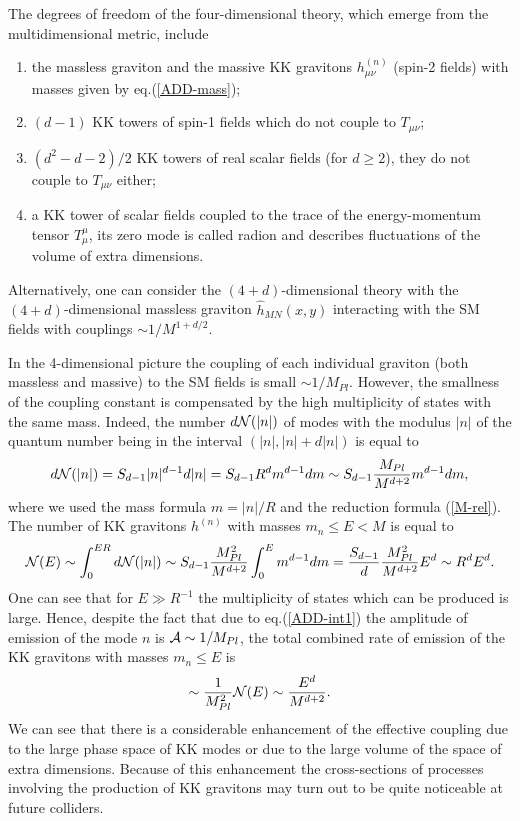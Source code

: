 \documentclass{cernyrep}
\begin{document}
The degrees of freedom of the four-dimensional theory, which
emerge from the multidimensional metric, include~\cite{GRW,Hew}
\begin{enumerate}
  \item the massless graviton and the massive KK gravitons $h^{(n)}_{\mu\nu}$
(spin-2 fields) with masses given by eq.(\ref{ADD-mass});
  \item $(d-1)$ KK towers of spin-1 fields which do not couple to $T_{\mu \nu}$;
  \item $(d^{2}-d-2)/2$ KK towers of real scalar fields (for $d \geq 2$), they
do not couple to $T_{\mu \nu}$ either;
\item  a KK tower of scalar fields coupled to the trace of the
energy-momentum tensor $T_{\mu}^{\mu}$, its zero mode is called
radion and describes fluctuations of the volume of extra
dimensions.
\end{enumerate}
Alternatively, one can consider the $(4+d)$-dimensional theory
with the $(4+d)$-dimensional massless graviton $\hat{h}_{MN}(x,y)$
interacting with the SM fields with couplings $\sim 1/M^{1+d/2}$.

In the 4-dimensional  picture the coupling of each individual
graviton (both massless and massive) to the SM fields is small
$\sim 1/M_{Pl}$. However, the smallness of the coupling constant
is compensated by the high multiplicity of states with the same
mass. Indeed, the number $d{\cal N}(|n|)$ of modes with the
modulus $|n|$ of the quantum number being in the interval
$(|n|,|n|+d|n|)$ is equal to
\begin{equation}\label{ADD-dN}
  d{\cal N}(|n|) = S_{d-1} |n|^{d-1}d|n| = S_{d-1} R^{d}
m^{d-1}dm \sim S_{d-1} \frac{M_{Pl}}{M^{d+2}} m^{d-1}dm,
\end{equation}
 where we used the mass formula $m=|n|/R$
and the reduction formula (\ref{M-rel}). The number of KK
gravitons $h^{(n)}$ with masses $m_{n} \leq E < M$ is equal to
\[
{\cal N}(E) \sim \int_{0}^{ER} d{\cal N}(|n|) \sim S_{d-1}
\frac{M^{2}_{Pl}}{M^{d+2}} \int_{0}^{E} m^{d-1}dm =
\frac{S_{d-1}}{d} \frac{M^{2}_{Pl}}{M^{d+2}} E^{d} \sim R^{d}
E^{d}.
\]
 One can see that for $E \gg R^{-1}$ the multiplicity of states which
can be produced is large. Hence, despite the fact that due to
eq.(\ref{ADD-int1}) the amplitude of emission of the mode $n$ is
${\cal A} \sim 1/M_{Pl}$, the total combined rate of emission of
the KK gravitons with masses $m_{n} \leq E$ is
\begin{equation}\label{ADD-rate}
  \sim \frac{1}{M_{Pl}^{2}} {\cal N}(E) \sim
\frac{E^{d}}{M^{d+2}}.
\end{equation}
 We can see that there is a considerable
enhancement of the effective coupling due to the large phase space
of KK modes or due to the large volume of the space of extra
dimensions. Because of this enhancement the cross-sections of
processes involving the production of KK gravitons may turn out to
be quite noticeable at future colliders.
\end{document}
